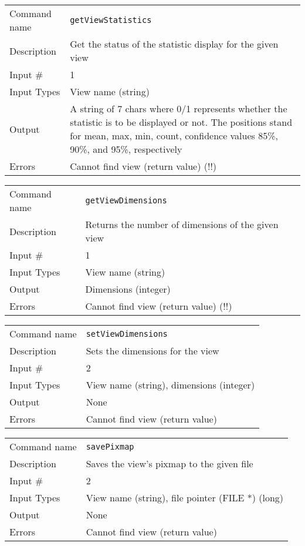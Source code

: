 \bigskip

\noindent
\begin{tabular}{l|p{5in}}
\hline
Command name & {\tt getViewStatistics} \\
Description  & Get the status of the statistic display for the given view \\
Input \#     & 1 \\
Input Types  & View name (string) \\
Output       & A string of 7 chars where 0/1 represents whether the
               statistic is to be displayed or not. The positions stand for
               mean, max, min, count, confidence values 85\%, 90\%, and 95\%,
               respectively \\
Errors       & Cannot find view (return value) (!!) \\
\hline
\end{tabular}

\bigskip

\noindent
\begin{tabular}{l|p{5in}}
\hline
Command name & {\tt getViewDimensions} \\
Description  & Returns the number of dimensions of the given view \\
Input \#     & 1 \\
Input Types  & View name (string) \\
Output       & Dimensions (integer) \\
Errors       & Cannot find view (return value) (!!) \\
\hline
\end{tabular}

\bigskip

\noindent
\begin{tabular}{l|p{5in}}
\hline
Command name & {\tt setViewDimensions} \\
Description  & Sets the dimensions for the view \\
Input \#     & 2 \\
Input Types  & View name (string), dimensions (integer) \\
Output       & None \\
Errors       & Cannot find view (return value) \\
\hline
\end{tabular}

\bigskip

\noindent
\begin{tabular}{l|p{5in}}
\hline
Command name & {\tt savePixmap} \\
Description  & Saves the view's pixmap to the given file \\
Input \#     & 2 \\
Input Types  & View name (string), file pointer (FILE *) (long) \\
Output       & None \\
Errors       & Cannot find view (return value) \\
\hline
\end{tabular}

